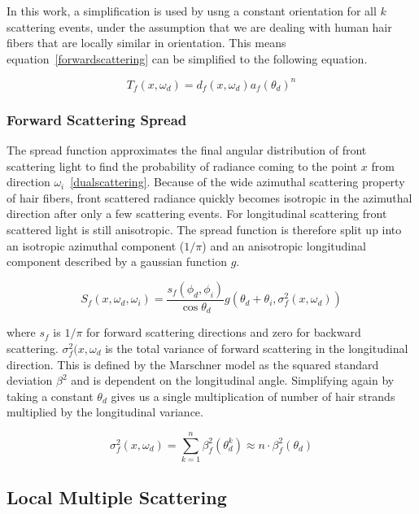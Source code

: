 In this work, a simplification is used by usng a constant orientation for all $k$ scattering events, under the assumption that we are dealing with human hair fibers that are locally similar in orientation. This means equation~\ref{forwardscattering} can be simplified to the following equation.

\begin{equation}
T_f(x, \omega_d) = d_f(x, \omega_d) a_f(\theta_d)^n
\label{forwardscattering}
\end{equation}

\subsubsection{Forward Scattering Spread}

The spread function approximates the final angular distribution of front scattering light to find the probability of radiance coming to the point $x$ from direction $\omega_i$~\ref{dualscattering}. Because of the wide azimuthal scattering property of hair fibers, front scattered radiance quickly becomes isotropic in the azimuthal direction after only a few scattering events. For longitudinal scattering front scattered light is still anisotropic. The spread function is therefore split up into an isotropic azimuthal component ($1/\pi$) and an anisotropic longitudinal component described by a gaussian function $g$.

\begin{equation}
S_f(x, \omega_d, \omega_i) = \frac{s_f(\phi_d, \phi_i)}{\cos \theta_d} g(\theta_d + \theta_i, \sigma_f^2(x, \omega_d))
\end{equation}

where $s_f$ is $1/\pi$ for forward scattering directions and zero for backward scattering. $\sigma_f^2(x, \omega_d$ is the total variance of forward scattering in the longitudinal direction. This is defined by the Marschner model as the squared standard deviation $\beta^2$ and is dependent on the longitudinal angle. Simplifying again by taking a constant $\theta_d$ gives us a single multiplication of number of hair strands multiplied by the longitudinal variance.

\begin{equation}
\sigma_f^2(x, \omega_d) = \sum_{k=1}^{n} \beta_f^2(\theta_d^k) \approx n \cdot \beta_f^2(\theta_d)
\end{equation}


\subsection{Local Multiple Scattering}

